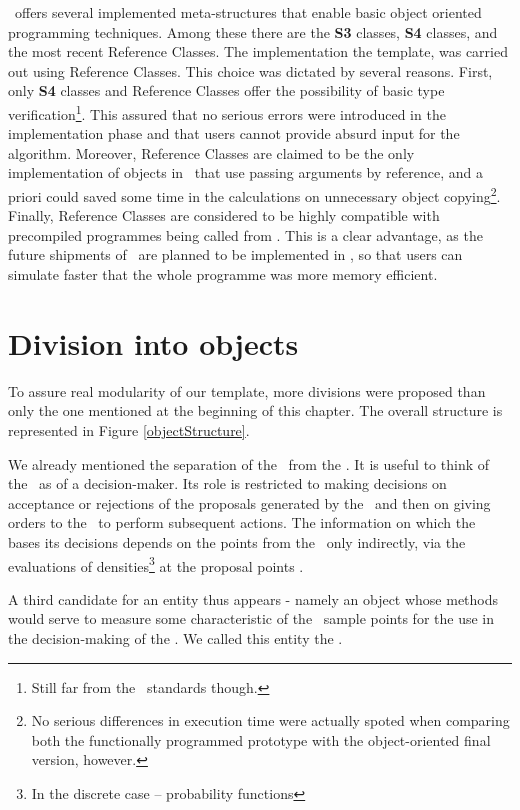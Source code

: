 \documentclass{book}
\begin{document}
\RR\, offers several implemented meta-structures that enable basic object oriented programming techniques. Among these there are the \textbf{S3} classes, \textbf{S4} classes, and the most recent Reference Classes. The implementation the template, was carried out using Reference Classes. This choice was dictated by several reasons. First, only \textbf{S4} classes and Reference Classes offer the possibility of basic type verification\footnote{Still far from the \Cpp\, standards though.}. This assured that no serious errors were introduced in the implementation phase and that users cannot provide absurd input for the algorithm. Moreover, Reference Classes are claimed to be the only implementation of objects in \RR\, that use passing arguments by reference, and a priori could saved some time in the calculations on unnecessary object copying\footnote{No serious differences in execution time were actually spoted when comparing both the functionally programmed prototype with the object-oriented final version, however.}. Finally, Reference Classes are considered to be highly compatible with \Cpp\, precompiled programmes being called from \RR. This is a clear advantage, as the future shipments of \ssimul\, are planned to be implemented in \Cpp, so that users can simulate faster that the whole programme was more memory efficient.   

\section{Division into objects}

To assure real modularity of our template, more divisions were proposed than only the one mentioned at the beginning of this chapter. The overall structure is represented in Figure \ref{objectStructure}.

We already mentioned the separation of the \algo\, from the \sspace. It is useful to think of the \algo\, as of a decision-maker. Its role is restricted to making decisions on acceptance or rejections of the proposals generated by the \sspace\, and then on giving orders to the \sspace\, to perform subsequent actions. The information on which the \algo\, bases its decisions depends on the points from the \sspace\, only indirectly, via the evaluations of densities\footnote{In the discrete case -- probability functions} at the proposal points .

 A third candidate for an entity thus appears - namely an object whose methods would serve to measure some characteristic of the \sspace\, sample points for the use in the decision-making of the \algo. We called this entity the \measure. 
\end{document}
